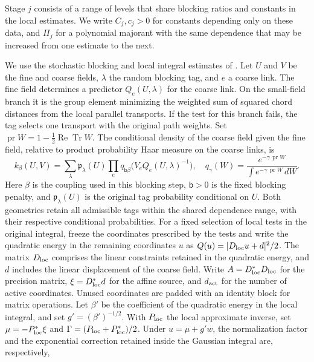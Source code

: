 \documentclass[11pt,a4paper]{article}
\numberwithin{equation}{section}
\newcommand{\Tr}{\operatorname{Tr}}
\begin{document}
Stage \(j\) consists of a range of levels that share blocking ratios and constants in the local estimates. We write \(C_j,c_j>0\) for constants depending only on these data, and \(\Pi_j\) for a polynomial majorant with the same dependence that may be increased from one estimate to the next.

We use the stochastic blocking and local integral estimates of \cite[Definition 5.1 and Lemmas 11.12--11.14 and 12.3--12.4]{armstrong}. Let \(U\) and \(V\) be the fine and coarse fields, \(\lambda\) the random blocking tag, and \(e\) a coarse link. The fine field determines a predictor \(Q_e(U,\lambda)\) for the coarse link. On the small-field branch it is the group element minimizing the weighted sum of squared chord distances from the local parallel transports. If the test for this branch fails, the tag selects one transport with the original path weights. Set \(\operatorname{pr}W=1-\tfrac12\operatorname{Re}\Tr W\). The conditional density of the coarse field given the fine field, relative to product probability Haar measure on the coarse links, is
\begin{equation}
 k_\beta(U,V)=\sum_\lambda \mathfrak p_\lambda(U)
       \prod_e q_{\mathsf b\beta}\big(V_e Q_e(U,\lambda)^{-1}\big),
 \quad q_\gamma(W)=\frac{e^{-\gamma\,\operatorname{pr} W}}
 {\int e^{-\gamma\,\operatorname{pr} W}\,dW}.
 \label{eq:geom-noise}
\end{equation}
Here \(\beta\) is the coupling used in this blocking step, \(\mathsf b>0\) is the fixed blocking penalty, and \(\mathfrak p_\lambda(U)\) is the original tag probability conditional on \(U\). Both geometries retain all admissible tags within the shared dependence range, with their respective conditional probabilities. For a fixed selection of local tests in the original integral, freeze the coordinates prescribed by the tests and write the quadratic energy in the remaining coordinates \(u\) as \(Q(u)=|D_{\rm loc}u+d|^2/2\). The matrix \(D_{\rm loc}\) comprises the linear constraints retained in the quadratic energy, and \(d\) includes the linear displacement of the coarse field. Write \(A=D_{\rm loc}^*D_{\rm loc}\) for the precision matrix, \(\xi=D_{\rm loc}^*d\) for the affine source, and \(d_{\rm act}\) for the number of active coordinates. Unused coordinates are padded with an identity block for matrix operations. Let \(\beta'\) be the coefficient of the quadratic energy in the local integral, and set \(g'=(\beta')^{-1/2}\). With \(P_{\rm loc}\) the local approximate inverse, set \(\mu=-P_{\rm loc}^*\xi\) and \(\Gamma=(P_{\rm loc}+P_{\rm loc}^*)/2\). Under \(u=\mu+g'w\), the normalization factor and the exponential correction retained inside the Gaussian integral are, respectively,
\end{document}
